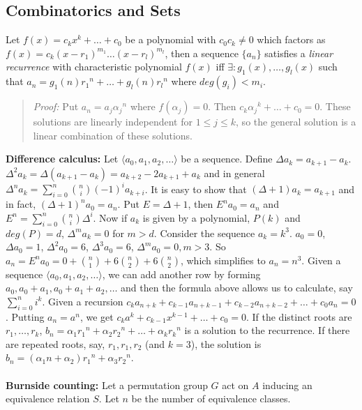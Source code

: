 \subsection{Combinatorics and Sets}
Let $f(x)= c_k x^k + \ldots + c_0$ be a polynomial
with $c_0 c_k \ne 0$ which factors as
$f(x)= c_k {(x- r_1 )}^{m_1} \ldots {(x- r_l )}^{m_l}$, then a sequence
$\{a_n \}$ satisfies a \emph{linear recurrence} with characteristic polynomial
$f(x)$ iff $\exists : g_1 (x) , \ldots , g_l (x)$ such that
$a_n = g_1 (n) {r_1}^n + \ldots + g_l (n) {r_l}^n$ where
$deg(g_{i})<m_{i}$.
\begin{quote}
\emph{Proof:} Put $a_n = a_j {\alpha_j}^n$ where $f(\alpha_j)=0$.
Then $c_k {\alpha_j}^k + \ldots + c_0 = 0$.  These solutions are linearly independent for $1 \leq j \leq k$, so the general solution
is a linear combination of these solutions.
\end{quote}
{\bf Difference calculus:} Let $\langle a_0, a_1, a_2, \ldots \rangle$ be a sequence.  Define $\Delta a_k = a_{k+1} - a_k$.
$\Delta^2 a_k = \Delta (a_{k+1} - a_k) = a_{k+2} - 2a_{k+1} + a_k$ and in general
$\Delta^n a_k = \sum_{i=0}^n {n \choose i} (-1)^i a_{k+i}$.  It is easy to show that $(\Delta + 1) a_k = a_{k+1}$ and in
fact, $(\Delta + 1)^n a_0 = a_{n}$.  
Put $E= \Delta + 1$, then $E^n a_0 = a_n$ and $E^n= \sum_{i=0}^n {n \choose i} \Delta^{i}$. Now if $a_k$ is given by
a polynomial, $P(k)$ and $deg(P) = d$, $\Delta^m a_k = 0$ for $m > d$.  Consider the sequence $a_k= k^3$.
$a_0 = 0$, $\Delta a_0 = 1$, $\Delta^2 a_0 = 6$, $\Delta^3 a_0 = 6$, $\Delta^m a_0 = 0, m > 3$.
So $a_n = E^n a_0 = 0 + {n \choose 1} + 6 {n \choose 2} + 6 {n \choose 2}$, which simplifies to
$a_n = n^3$.  Given a sequence $\langle a_0, a_1, a_2, \ldots \rangle$, we can add another row by forming
$a_0, a_0 + a_1, a_0 + a_1 +  a_2, \ldots$ and then the formula above allows us to calculate, say $\sum_{i=0}^n i^k$.
Given a recursion $c_k a_{n+k} + c_{k - 1} a_{n+k-1} + c_{k - 2} a_{n+k-2} + \ldots +c_{0} a_{n} =0$.  Putting
$a_n = a^n$, we get $c_k a^k + c_{k - 1} x^{k-1}  + \ldots +c_{0} =0$.  If the distinct
roots are $r_1, \ldots , r_k$, $b_n = \alpha_1 {r_1}^n + \alpha_2 {r_2}^n + \ldots +\alpha_k {r_k}^n$ is a solution
to the recurrence.   If there are repeated roots, say, $r_1, r_1, r_2$ (and $k=3$), the solution is
$b_n= (\alpha_1 n +\alpha_2) {r_1}^n + \alpha_3 {r_2}^n$.
\\
\\
{\bf Burnside counting:}  Let a permutation group $G$ act on $A$ inducing an equivalence
relation $S$.  Let $n$ be the number of equivalence classes.
